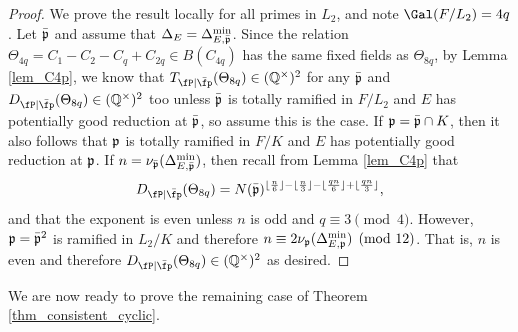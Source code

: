\begin{proof}
    We prove the result locally for all primes in $L_2$, and note $\Gal(F/L_2)=4q$. Let $\bar{\mathfrak{p}}$ and assume that $\Delta_E=\Delta_{E,\bar{\mathfrak{p}}}^{\min}$. Since the relation $\Theta_{4q}=C_1-C_2-C_q+C_{2q}\in B(C_{4q})$ has the same fixed fields as $\Theta_{8q}$, by Lemma \ref{lem_C4p}, we know that $\Tpb(\Theta_{8q})\in\QQss$ for any $\bar{\mathfrak{p}}$ and $\Dpb(\Theta_{8q})\in\QQss$ too unless $\bar{\mathfrak{p}}$ is totally ramified in $F/L_2$ and $E$ has potentially good reduction at $\bar{\mathfrak{p}}$, so assume this is the case. If $\mathfrak{p}=\bar{\mathfrak{p}}\cap K$, then it also follows that $\mathfrak{p}$ is totally ramified in $F/K$ and $E$ has potentially good reduction at $\mathfrak{p}$. If $n=\nu_{\bar{\mathfrak{p}}}(\Delta_{E,\bar{\mathfrak{p}}}^{\min})$, then recall from Lemma \ref{lem_C4p} that 
    $$\Dpb(\Theta_{8q})=N(\bar\pp)^{\floor{\frac{n}{6}}-\floor{\frac{n}{3}}-\floor{\frac{qn}{6}}+\floor{\frac{qn}{3}}},$$
    and that the exponent is even unless $n$ is odd and $q\equiv 3\pmod{4}$. However, $\mathfrak{p}=\bar{\mathfrak{p}}^2$ is ramified in $L_2/K$ and therefore $n\equiv 2\nu_{\mathfrak{p}}(\Delta_{E,\mathfrak{p}}^{\min})\pmod{12}$. That is, $n$ is even and therefore $\Dpb(\Theta_{8q})\in\QQss$ as desired.
\end{proof}


We are now ready to prove the remaining case of Theorem \ref{thm_consistent_cyclic}.

